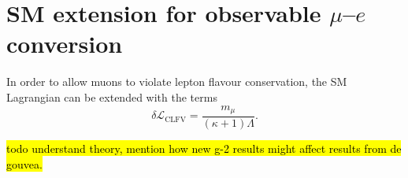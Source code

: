 




\section{SM extension for observable $\mu$--$e$ conversion}
In order to allow muons to violate lepton flavour conservation, the SM
Lagrangian can be extended with the terms
$$
\delta \mathcal{L_\mathrm{CLFV}} = \frac{m_\mu}{(\kappa+1)\Lambda}.
$$

\hl{ todo understand theory, mention how new g-2 results might affect results
    from de gouvea. }

